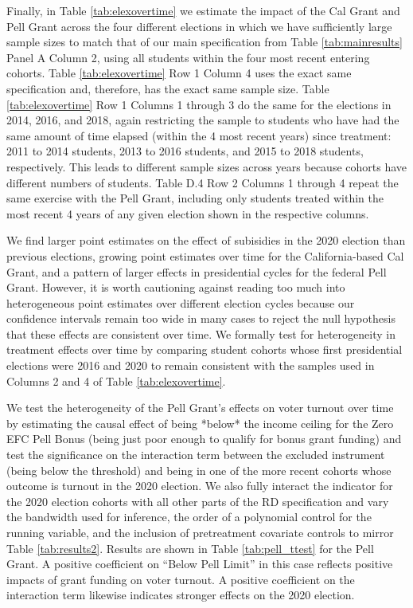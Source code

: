 \documentclass[12pt,letterpaper,oneside]{book}
\begin{document}
Finally, in Table \ref{tab:elexovertime} we estimate the impact of the Cal Grant and Pell Grant across the four different elections in which we have sufficiently large sample sizes to match that of our main specification from Table \ref{tab:mainresults} Panel A Column 2, using all students within the four most recent entering cohorts.  Table \ref{tab:elexovertime} Row 1 Column 4 uses the exact same specification and, therefore, has the exact same sample size. Table \ref{tab:elexovertime} Row 1 Columns 1 through 3 do the same for the elections in 2014, 2016, and 2018, again restricting the sample to students who have had the same amount of time elapsed (within the 4 most recent years) since treatment: 2011 to 2014 students, 2013 to 2016 students, and 2015 to 2018 students, respectively. This leads to different sample sizes across years because cohorts have different numbers of students. Table D.4 Row 2 Columns 1 through 4 repeat the same exercise with the Pell Grant, including only students treated within the most recent 4 years of any given election shown in the respective columns.

We find larger point estimates on the effect of subisidies in the 2020 election than previous elections, growing point estimates over time for the California-based Cal Grant, and a pattern of larger effects in presidential cycles for the federal Pell Grant. However, it is worth cautioning against reading too much into heterogeneous point estimates over different election cycles because our confidence intervals remain too wide in many cases to reject the null hypothesis that these effects are consistent over time. We formally test for heterogeneity in treatment effects over time by comparing student cohorts whose first presidential elections were 2016 and 2020 to remain consistent with the samples used in Columns 2 and 4 of Table \ref{tab:elexovertime}.

We test the heterogeneity of the Pell Grant's effects on voter turnout over time by estimating the causal effect of being *below* the income ceiling for the Zero EFC Pell Bonus (being just poor enough to qualify for bonus grant funding) and test the significance on the interaction term between the excluded instrument (being below the threshold) and being in one of the more recent cohorts whose outcome is turnout in the 2020 election. We also fully interact the indicator for the 2020 election cohorts with all other parts of the RD specification and vary the bandwidth used for inference, the order of a polynomial control for the running variable, and the inclusion of pretreatment covariate controls to mirror Table \ref{tab:results2}. Results are shown in Table \ref{tab:pell_ttest} for the Pell Grant. A positive coefficient on ``Below Pell Limit'' in this case reflects positive impacts of grant funding on voter turnout. A positive coefficient on the interaction term likewise indicates stronger effects on the 2020 election.
\end{document}
